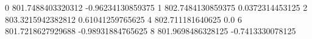 0 801.7488403320312 -0.96234130859375
1 802.7484130859375 0.0372314453125
2 803.3215942382812 0.61041259765625
4 802.711181640625 0.0
6 801.7218627929688 -0.98931884765625
8 801.9698486328125 -0.7413330078125
